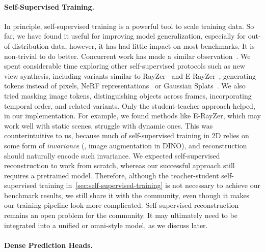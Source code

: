 \paragraph{Self-Supervised Training.} 
In principle, self-supervised training is a powerful tool to scale training data.
So far, we have found it useful for improving model generalization, especially for out-of-distribution data, however, it has had little impact on most benchmarks.
It is non-trivial to do better.
Concurrent work has made a similar observation~\cite{huang2026self}. 
We spent considerable time exploring other self-supervised protocols such as new view synthesis, including variants similar to RayZer~\cite{jiang25rayzer:} and E-RayZer~\cite{zhao26e-rayzer:}, generating tokens instead of pixels, NeRF representations~\cite{barron21mip-nerf:} or Gaussian Splats~\cite{kerbl233d-gaussian}. 
We also tried masking image tokens, distinguishing objects across frames, incorporating temporal order, and related variants. 
Only the student-teacher approach helped, in our implementation. 
For example, we found methods like E-RayZer, which may work well with static scenes, struggle with dynamic ones.
This was counterintuitive to us, because much of self-supervised training in 2D relies on some form of \textit{invariance} (\eg, image augmentation in DINO), and reconstruction should naturally encode such invariance.  
We expected self-supervised reconstruction to work from scratch, whereas our successful approach still requires a pretrained model. 
Therefore, although the teacher-student self-supervised training in~\cref{sec:self-supervised-training} is not necessary to achieve our benchmark results, we still share it with the community, even though it makes our training pipeline look more complicated. 
Self-supervised reconstruction remains an open problem for the community. 
It may ultimately need to be integrated into a unified or omni-style model, as we discuss later. 




\paragraph{Dense Prediction Heads.}

